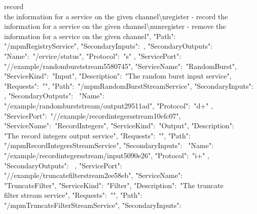 record\\
the information for a service on the given channel\textbackslash{}nregister - record the\\
information for a service on the given channel\textbackslash{}nunregister - remove the\\
information for a service on the given channel", "Path":\ \\
"\textellipsis/mpmRegistryService", "SecondaryInputs":\ \sqPair, "SecondaryOutputs":\
\openSq{} \textbraceleft\\
"Name":\ "/\textdollar{}ervice/status", "Protocol":\ "s" \textbraceright{} \closeSq{}
\textbraceright, \textbraceleft{} "ServicePort":\ \\
"/\serviceName/example/randomburststream\textunderscore{}5580745", "ServiceName":\ 
"RandomBurst",\\
"ServiceKind":\ "Input", "Description":\ "The random burst input service",\\
"Requests":\ "", "Path":\ "\textellipsis/mpmRandomBurstStreamService",
"SecondaryInputs":\ \\
\sqPair, "SecondaryOutputs":\ \openSq{} \textbraceleft{} "Name":\ \\
"/example/randomburststream/output\textunderscore{}29511ad", "Protocol":\ "d+"
\textbraceright{} \closeSq{} \textbraceright, \textbraceleft\\
"ServicePort":\ "/\serviceName/example/recordintegersstream\textunderscore{}10efc07",\\
"ServiceName":\ "RecordIntegers", "ServiceKind":\ "Output", "Description":\ \\
"The record integers output service", "Requests":\ "", "Path":\ \\
"\textellipsis/mpmRecordIntegersStreamService", "SecondaryInputs":\ \openSq{}
\textbraceleft{} "Name":\ \\
"/example/recordintegersstream/input\textunderscore{}5090e26", "Protocol":\ "i+"
\textbraceright{} \closeSq,\\
"SecondaryOutputs":\ \sqPair{} \textbraceright, \textbraceleft{} "ServicePort":\ \\
"/\serviceName/example/truncatefilterstream\textunderscore{}2ee58eb", "ServiceName":\ \\
"TruncateFilter", "ServiceKind":\ "Filter", "Description":\ "The truncate\\
filter stream service", "Requests":\ "", "Path":\ \\
"\textellipsis/mpmTruncateFilterStreamService", "SecondaryInputs":\ \openSq{}
